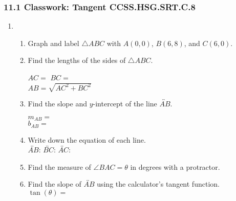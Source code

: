 \documentclass[12pt, twoside]{article}
\begin{document}
\subsubsection*{11.1 Classwork: Tangent \hfill CCSS.HSG.SRT.C.8}
\begin{enumerate}
  \item \begin{enumerate}
    \item Graph and label $\triangle ABC$ with $A(0,0)$, $B(6,8)$, and $C(6,0)$.
    \begin{center}
    \end{center}
    \item Find the lengths of the sides of $\triangle ABC$.
    \begin{multicols}{2}
      $AC=$ \hspace{3cm}
      $BC=$ \\[1cm]
      $AB=\sqrt{AC^2+BC^2}$
    \end{multicols} \vspace{1.75cm}
    \item Find the slope and $y$-intercept of the line $\overleftrightarrow{AB}$.
      \begin{multicols}{2}
        $m_{AB}=$ \\
        $b_{AB}=$
      \end{multicols}
    \item Write down the equation of each line. \\[0.5cm]
      $\overleftrightarrow{AB}$: \hfill
      $\overleftrightarrow{BC}$: \hfill
      $\overleftrightarrow{AC}$: \hspace{2cm}
    \vspace{1cm}
    \item Find the measure of $\angle BAC=\theta$ in degrees with a protractor. \vspace{0.5cm}
    \item Find the slope of $\overleftrightarrow{AB}$ using the calculator's tangent function.\\[0.25cm]
    $\displaystyle \tan(\theta)=$
  \end{enumerate}


\end{enumerate}
\end{document}
